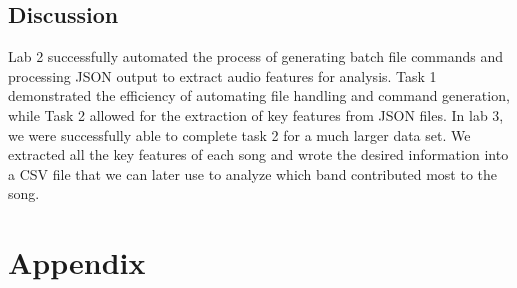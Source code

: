 \documentclass{article}\usepackage[]{graphicx}\usepackage[]{xcolor}
\begin{document}
\begin{multicols}{2}
\section{Discussion}
Lab 2 successfully automated the process of generating batch file commands and processing JSON output to extract audio features for analysis. Task 1 demonstrated the efficiency of automating file handling and command generation, while Task 2 allowed for the extraction of key features from JSON files. In lab 3, we were successfully able to complete task 2 for a much larger data set. We extracted all the key features of each song and wrote the desired information into a CSV file that we can later use to analyze which band contributed most to the song.

\vspace{2em}

\begin{tiny}

\end{tiny}
\end{multicols}

\newpage
\onecolumn
\section{Appendix}
\end{document}
